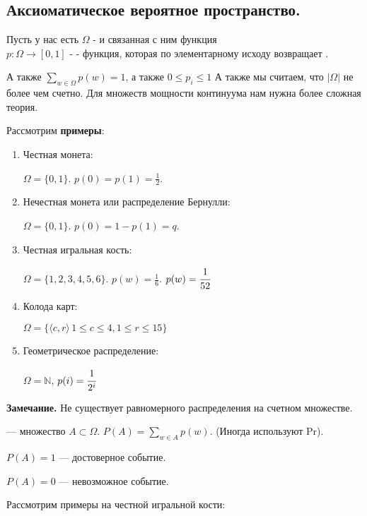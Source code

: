 \subsection{Аксиоматическое вероятное пространство.}

Пусть у нас есть $\Omega$ -  и связанная с ним функция \\ $p: \Omega \rightarrow [0,1]$  -  - функция, которая по элементарному исходу возвращает .

А также $\sum\limits_{w \in \Omega} p(w) = 1$, а также $0 \leq p_i \leq 1$  А также мы считаем, что $|\Omega|$ не более чем счетно. Для множеств мощности континуума нам нужна более сложная теория.  

Рассмотрим \textbf{примеры}:

\begin{enumerate}
    \item {Честная монета:}

    $\Omega = \{0,1\}$. $p(0) = p(1) = \frac{1}{2}$.

    \item {Нечестная монета} или распределение Бернулли:
    
    $\Omega = \{0,1\}$. $p(0) = 1 - p(1) = q$.

     \item {Честная игральная кость:}

    $\Omega = \{1,2,3,4,5,6\}$. $p(w) = \frac{1}{6}$. $p(w) = \cfrac{1}{52}$

    \item Колода карт:

    $\Omega = \{\langle c, r\rangle\, 1\leq c \leq 4, 1\leq r \leq 15\}$

    \item Геометрическое распределение:

    $\Omega = \mathbb{N}$, $p(i) = \cfrac{1}{2^i}$
    
\end{enumerate}

\textbf{Замечание.} Не существует равномерного распределения на счетном множестве.

 ---  множество $A \subset \Omega$. $P(A) = \sum\limits_{w \in A} p(w)$. (Иногда используют Pr).

$P(A) = 1 $ --- достоверное событие.

$P(A) = 0 $ --- невозможное событие.

Рассмотрим примеры на честной игральной кости:


